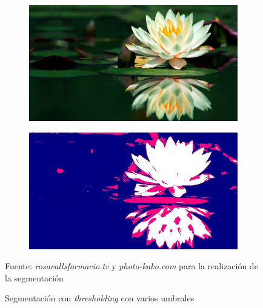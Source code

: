 \begin{figure}[H]	
	\captionsetup{justification=centering}	
	\centering	
	\begin{subfigure}[t]{2.5in}
		\centering
		\includegraphics[width=.9\textwidth]{./imagenes/thresholding3}
		\label{thresholding3}
	\end{subfigure}
	\begin{subfigure}[t]{2.5in}
		\centering
		\includegraphics[width=.9\textwidth]{./imagenes/thresholding4}
		\label{thresholding4}
	\end{subfigure}
	\caption{Segmentaci\'{o}n con \textit{thresholding} con varios umbrales}
	\vspace{2 mm}			
	Fuente: \textit{rosavallsformacio.tv} y \textit{photo-kako.com} para la realizaci\'{o}n de la segmentaci\'{o}n
	\label{thresHold2}
\end{figure}	
